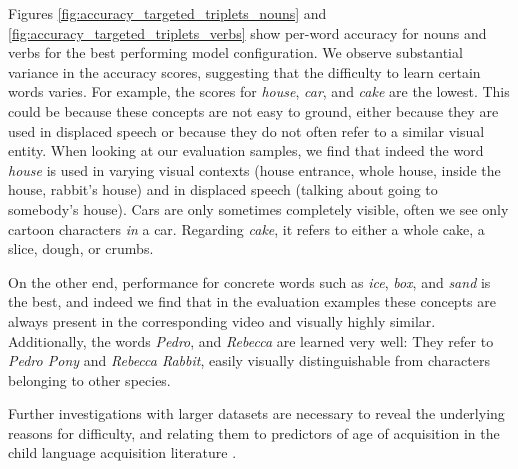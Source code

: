 Figures \ref{fig:accuracy_targeted_triplets_nouns} and 
\ref{fig:accuracy_targeted_triplets_verbs} show per-word
accuracy for nouns and verbs for the best performing model configuration.
We observe substantial variance in the accuracy scores, suggesting that the 
difficulty to learn certain words varies. For example, the 
scores for \textit{house}, \textit{car}, and \textit{cake} are the lowest. This could be 
because these concepts are not easy to ground, either because they are used in 
displaced speech or because they do not often refer to a similar visual entity. 
When looking at our evaluation samples, we find that indeed the word \textit{house} 
is used in varying visual contexts (house entrance, whole house, inside the
house, rabbit's house) and in displaced speech (talking about going 
to somebody's house). Cars are only sometimes completely visible, often we see 
only cartoon characters \textit{in} a car. Regarding \textit{cake}, it refers to either a 
whole cake, a slice, dough, or crumbs.

On the other end, performance for concrete words such as \textit{ice}, 
\textit{box}, 
and \textit{sand} is the best, and indeed we find that in the evaluation examples 
these concepts are always present in the corresponding video and visually 
highly similar. Additionally, the words \textit{Pedro}, and \textit{Rebecca} 
are learned very well: They refer to \textit{Pedro Pony} and \textit{Rebecca Rabbit}, 
easily visually distinguishable from characters belonging to other species.

Further investigations with larger datasets are necessary to reveal the 
underlying reasons for difficulty, and relating them to predictors of age of 
acquisition in the child language acquisition literature 
\cite{roy2015predicting,frank2021variability}. 


